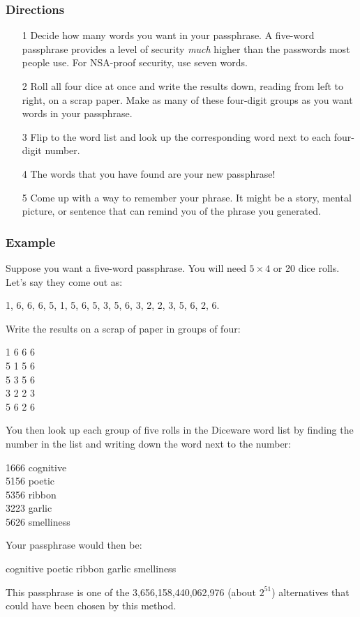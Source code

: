 \subsubsection*{Directions}

\begin{itemize}[leftmargin=*]

\item[1] Decide how many words you want in your passphrase. A five-word passphrase provides a level of security \textit{much} higher than the passwords most people use. For NSA-proof security, use seven words.

\item[2] Roll all four dice at once and write the results down, reading from left to right, on a scrap paper. Make as many of these four-digit groups as you want words in your passphrase.

\item[3] Flip to the word list and look up the corresponding word next to each four-digit number.

\item[4] The words that you have found are your new passphrase!

\item[5] Come up with a way to remember your phrase. It might be a story, mental picture, or sentence that can remind you of the phrase you generated.

\end{itemize}

\newpage

\subsubsection*{Example}

Suppose you want a five-word passphrase. You will need $5 \times 4$ or 20 dice rolls. Let's say they come out as:

1, 6, 6, 6, 5, 1, 5, 6, 5, 3, 5, 6, 3, 2, 2, 3, 5, 6, 2, 6. 

Write the results on a scrap of paper in groups of four:

1 6 6 6 \\
5 1 5 6 \\
5 3 5 6 \\
3 2 2 3 \\
5 6 2 6

You then look up each group of five rolls in the Diceware word list by finding the number in the list and writing down the word next to the number:

1666 cognitive \\
5156 poetic \\
5356 ribbon \\
3223 garlic \\
5626 smelliness

Your passphrase would then be:

cognitive poetic ribbon garlic smelliness

This passphrase is one of the 3,656,158,440,062,976 (about $2^{51}$) alternatives that could have been chosen by this method.
